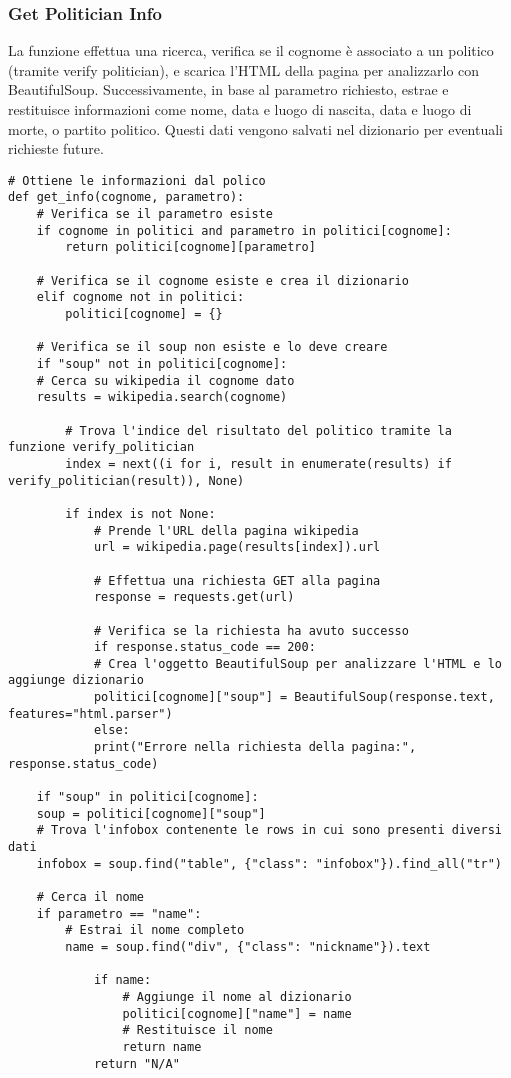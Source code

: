 \documentclass[12pt]{article}
\begin{document}
		\subsubsection{Get Politician Info}
La funzione effettua una ricerca, verifica se il cognome è associato a un politico (tramite verify politician), e scarica l'HTML della pagina per analizzarlo con BeautifulSoup.
Successivamente, in base al parametro richiesto, estrae e restituisce informazioni come nome, data e luogo di nascita, data e luogo di morte, o partito politico. Questi dati vengono salvati nel dizionario per eventuali richieste future.
		\begin{lstlisting}
# Ottiene le informazioni dal polico
def get_info(cognome, parametro):
	# Verifica se il parametro esiste 
	if cognome in politici and parametro in politici[cognome]:
		return politici[cognome][parametro]

	# Verifica se il cognome esiste e crea il dizionario
	elif cognome not in politici:
		politici[cognome] = {}

	# Verifica se il soup non esiste e lo deve creare
	if "soup" not in politici[cognome]:
	# Cerca su wikipedia il cognome dato
	results = wikipedia.search(cognome)

		# Trova l'indice del risultato del politico tramite la funzione verify_politician
		index = next((i for i, result in enumerate(results) if verify_politician(result)), None)

		if index is not None:
			# Prende l'URL della pagina wikipedia
			url = wikipedia.page(results[index]).url

			# Effettua una richiesta GET alla pagina
			response = requests.get(url)
			
			# Verifica se la richiesta ha avuto successo
			if response.status_code == 200:
			# Crea l'oggetto BeautifulSoup per analizzare l'HTML e lo aggiunge dizionario
			politici[cognome]["soup"] = BeautifulSoup(response.text, features="html.parser")
			else:
			print("Errore nella richiesta della pagina:", response.status_code)

	if "soup" in politici[cognome]:
	soup = politici[cognome]["soup"]
	# Trova l'infobox contenente le rows in cui sono presenti diversi dati
	infobox = soup.find("table", {"class": "infobox"}).find_all("tr")
	
	# Cerca il nome
	if parametro == "name":
		# Estrai il nome completo
		name = soup.find("div", {"class": "nickname"}).text

			if name:
				# Aggiunge il nome al dizionario
				politici[cognome]["name"] = name
				# Restituisce il nome
				return name
			return "N/A"


\end{lstlisting}
\end{document}

